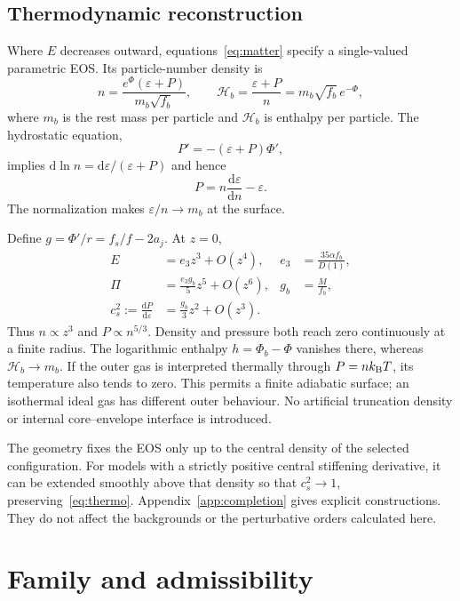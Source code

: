 \documentclass[aps,prd,reprint,a4paper,nofootinbib,floatfix]{revtex4-2}
\newcommand{\dd}{\mathrm d}
\begin{document}
\subsection{Thermodynamic reconstruction}
Where $E$ decreases outward, equations~\eqref{eq:matter} specify a single-valued parametric EOS. Its particle-number density is
\begin{equation}
 n=\frac{e^\Phi(\varepsilon+P)}{m_b\sqrt{f_b}},
 \qquad \mathcal H_b=\frac{\varepsilon+P}{n}=m_b\sqrt{f_b}\,e^{-\Phi},
 \label{eq:n}
\end{equation}
where $m_b$ is the rest mass per particle and $\mathcal H_b$ is enthalpy per particle. The hydrostatic equation,
\begin{equation}
 P'=-(\varepsilon+P)\Phi',
\end{equation}
implies $\dd\ln n=\dd\varepsilon/(\varepsilon+P)$ and hence
\begin{equation}
 P=n\frac{\dd\varepsilon}{\dd n}-\varepsilon.
 \label{eq:thermo}
\end{equation}
The normalization makes $\varepsilon/n\to m_b$ at the surface.

Define $g=\Phi'/r=f_s/f-2a_j$. At $z=0$,
\begin{align}
 E&=e_3z^3+O(z^4),& e_3&=\frac{35\alpha f_b}{D(1)},\nonumber\\
 \Pi&=\frac{e_3g_b}{5}z^5+O(z^6),&g_b&=\frac{M}{f_b},\label{eq:surfacepowers}\\
 c_s^2:=\frac{\dd P}{\dd\varepsilon}
 &=\frac{g_b}{3}z^2+O(z^3).&&\nonumber
\end{align}
Thus $n\propto z^3$ and $P\propto n^{5/3}$. Density and pressure both reach zero continuously at a finite radius. The logarithmic enthalpy $h=\Phi_b-\Phi$ vanishes there, whereas $\mathcal H_b\to m_b$. If the outer gas is interpreted thermally through $P=nk_{\rm B}T$, its temperature also tends to zero. This permits a finite adiabatic surface; an isothermal ideal gas has different outer behaviour. No artificial truncation density or internal core--envelope interface is introduced.

The geometry fixes the EOS only up to the central density of the selected configuration. For models with a strictly positive central stiffening derivative, it can be extended smoothly above that density so that $c_s^2\to1$, preserving~\eqref{eq:thermo}. Appendix~\ref{app:completion} gives explicit constructions. They do not affect the backgrounds or the perturbative orders calculated here.

\section{Family and admissibility}
\end{document}
